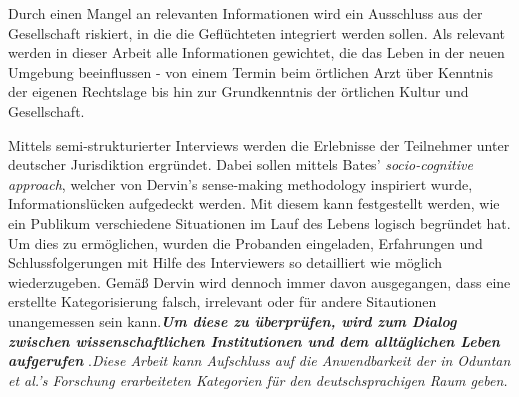 Durch einen Mangel an relevanten Informationen wird ein Ausschluss aus der Gesellschaft riskiert, in die die Gefl\"uchteten integriert werden sollen. \cite{andrade2016information}\newline
Als relevant werden in dieser Arbeit alle Informationen gewichtet, die das Leben in der neuen Umgebung beeinflussen - von einem Termin beim \"ortlichen Arzt \"uber Kenntnis der eigenen Rechtslage bis hin zur Grundkenntnis der \"ortlichen Kultur und Gesellschaft. \cite{schreieck2017supporting}\newline

Mittels semi-strukturierter Interviews werden die Erlebnisse der Teilnehmer unter deutscher Jurisdiktion ergr\"undet. Dabei sollen mittels Bates' \textit{socio-cognitive approach}\cite{bates2005introduction}, welcher von Dervin's sense-making methodology\cite{dervin2003sense} inspiriert wurde, Informationsl\"ucken aufgedeckt werden.\newline
Mit diesem kann festgestellt werden, wie ein Publikum verschiedene Situationen im Lauf des Lebens logisch begr\"undet hat. Um dies zu erm\"oglichen, wurden die Probanden eingeladen, Erfahrungen und Schlussfolgerungen mit Hilfe des Interviewers so detailliert wie m\"oglich wiederzugeben.\newline
Gem\"a\ss{} Dervin wird dennoch immer davon ausgegangen, dass eine erstellte Kategorisierung falsch, irrelevant oder f\"ur andere Sitautionen unangemessen sein kann.\textit{\textbf{Um diese zu \"uberpr\"ufen, wird zum Dialog zwischen wissenschaftlichen Institutionen und dem allt\"aglichen Leben aufgerufen}} .\textit{Diese Arbeit kann Aufschluss auf die Anwendbarkeit der in Oduntan et al.'s Forschung erarbeiteten Kategorien f\"ur den deutschsprachigen Raum geben.}\newline

